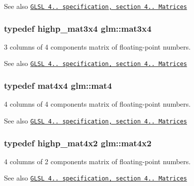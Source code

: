 \begin{DoxySeeAlso}{See also}
\href{http://www.opengl.org/registry/doc/GLSLangSpec.4.20.8.pdf}{\tt G\+L\+SL 4.. specification, section 4.. Matrices} 
\end{DoxySeeAlso}
\subsubsection[{\texorpdfstring{mat3x4}{mat3x4}}]{\setlength{\rightskip}{0pt plus 5cm}typedef highp\+\_\+mat3x4 {\bf glm\+::mat3x4}}\hypertarget{group__core__types_ga5524ae15d7fc00a68b8e0e3a0733cc2a}{}\label{group__core__types_ga5524ae15d7fc00a68b8e0e3a0733cc2a}
3 columns of 4 components matrix of floating-\/point numbers.

\begin{DoxySeeAlso}{See also}
\href{http://www.opengl.org/registry/doc/GLSLangSpec.4.20.8.pdf}{\tt G\+L\+SL 4.. specification, section 4.. Matrices} 
\end{DoxySeeAlso}
\subsubsection[{\texorpdfstring{mat4}{mat4}}]{\setlength{\rightskip}{0pt plus 5cm}typedef mat4x4 {\bf glm\+::mat4}}\hypertarget{group__core__types_ga7dcd2365c2e368e6af5b7adeb6a9c8df}{}\label{group__core__types_ga7dcd2365c2e368e6af5b7adeb6a9c8df}
4 columns of 4 components matrix of floating-\/point numbers.

\begin{DoxySeeAlso}{See also}
\href{http://www.opengl.org/registry/doc/GLSLangSpec.4.20.8.pdf}{\tt G\+L\+SL 4.. specification, section 4.. Matrices} 
\end{DoxySeeAlso}
\subsubsection[{\texorpdfstring{mat4x2}{mat4x2}}]{\setlength{\rightskip}{0pt plus 5cm}typedef highp\+\_\+mat4x2 {\bf glm\+::mat4x2}}\hypertarget{group__core__types_ga72cf8ec4f4cda85943f4683531e421bc}{}\label{group__core__types_ga72cf8ec4f4cda85943f4683531e421bc}
4 columns of 2 components matrix of floating-\/point numbers.

\begin{DoxySeeAlso}{See also}
\href{http://www.opengl.org/registry/doc/GLSLangSpec.4.20.8.pdf}{\tt G\+L\+SL 4.. specification, section 4.. Matrices} 
\end{DoxySeeAlso}
